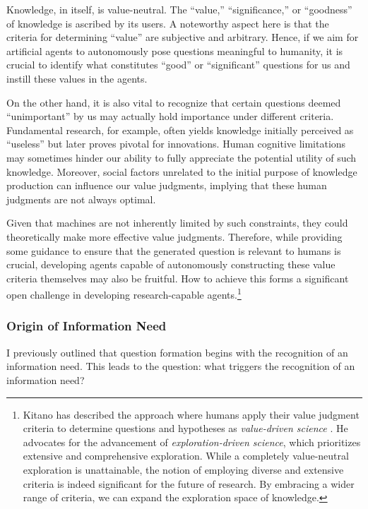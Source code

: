 \documentclass{article}
\begin{document}
Knowledge, in itself, is value-neutral. The ``value,'' ``significance,'' or ``goodness'' of knowledge is ascribed by its users. A noteworthy aspect here is that the criteria for determining ``value'' are subjective and arbitrary. Hence, if we aim for artificial agents to autonomously pose questions meaningful to humanity, it is crucial to identify what constitutes ``good'' or ``significant'' questions for us and instill these values in the agents.

On the other hand, it is also vital to recognize that certain questions deemed ``unimportant'' by us may actually hold importance under different criteria. Fundamental research, for example, often yields knowledge initially perceived as ``useless'' but later proves pivotal for innovations. Human cognitive limitations may sometimes hinder our ability to fully appreciate the potential utility of such knowledge. Moreover, social factors unrelated to the initial purpose of knowledge production can influence our value judgments, implying that these human judgments are not always optimal.

Given that machines are not inherently limited by such constraints, they could theoretically make more effective value judgments. Therefore, while providing some guidance to ensure that the generated question is relevant to humans is crucial, developing agents capable of autonomously constructing these value criteria themselves may also be fruitful. How to achieve this forms a significant open challenge in developing research-capable agents.\footnote{
Kitano has described the approach where humans apply their value judgment criteria to determine questions and hypotheses as \textit{value-driven science} \cite{kitano2021nobel}. He advocates for the advancement of \textit{exploration-driven science}, which prioritizes extensive and comprehensive exploration. While a completely value-neutral exploration is unattainable, the notion of employing diverse and extensive criteria is indeed significant for the future of research. By embracing a wider range of criteria, we can expand the exploration space of knowledge.
}

\subsubsection{Origin of Information Need}
I previously outlined that question formation begins with the recognition of an information need. This leads to the question: what triggers the recognition of an information need?
\end{document}
